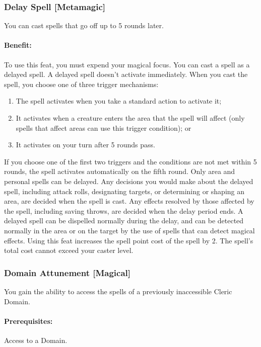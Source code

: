 \subsubsection[Delay Spell]{Delay Spell [Metamagic]}
\label{Feat:DelaySpell}
You can cast spells that go off up to 5 rounds later.

\paragraph{Benefit:} To use this feat, you must expend your magical focus. 
You can cast a spell as a delayed spell. A delayed spell doesn't activate immediately. 
When you cast the spell, you choose one of three trigger mechanisms: 
\begin{enumerate}
 \item The spell activates when you take a standard action to activate it;
 \item It activates when a creature enters the area that the spell will affect (only spells that affect areas can use this trigger condition); or
 \item It activates on your turn after 5 rounds pass.
\end{enumerate}   
If you choose one of the first two triggers and the conditions are not met within 5 rounds, the spell activates automatically on the fifth round.
Only area and personal spells can be delayed.
Any decisions you would make about the delayed spell, including attack rolls, designating targets, or determining or shaping an area, are decided when the spell is cast. 
Any effects resolved by those affected by the spell, including saving throws, are decided when the delay period ends.
A delayed spell can be dispelled normally during the delay, 
and can be detected normally in the area or on the target by the use of spells that can detect magical effects. 
Using this feat increases the spell point cost of the spell by 2. The spell's total cost cannot exceed your caster level.
\subsubsection[Domain Attunement]{Domain Attunement [Magical]}
\label{Feat:DomainAttunement}
You gain the ability to access the spells of a previously inaccessible Cleric Domain.
\paragraph{Prerequisites:} Access to a Domain.


